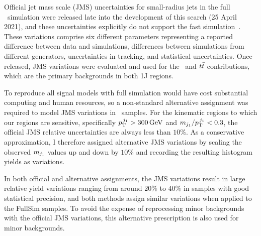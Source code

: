 Official jet mass scale (JMS) uncertainties for small-radius jets in the full
\atlas\ simulation were released late into the development of this search
(25 April 2021), and these uncertainties explicitly do not support the
fast simulation~\cite{atlas_twiki_smallrjms}.
These variations comprise six different parameters representing a reported
difference between data and simulations, differences between simulations from
different generators, uncertainties in tracking, and statistical uncertainties.
Once released, JMS variations were evaluated and used for the \diboson\ and
$\ttbar$ contributions, which are the primary backgrounds in both 1J regions.

To reproduce all signal models with full simulation would have cost substantial
computing and human resources, so a non-standard alternative assignment was
required to model JMS variations in \afii\ samples.
For the kinematic regions to which our regions are sensitive, specifically
$\ptjone > 300\,\eV[G]$ and $\mjetone/\ptjone < 0.3$, the official
JMS relative uncertainties are always less than $10\%$.
As a conservative approximation, I therefore assigned alternative JMS
variations by scaling the observed $\mjetone$ values up and down by $10\%$
and recording the resulting histogram yields as variations.

In both official and alternative assignments, the JMS variations result in
large relative yield variations ranging from around $20\%$ to $40\%$ in samples
with good statistical precision, and both methods assign similar variations
when applied to the FullSim samples.
To avoid the expense of reprocessing minor backgrounds with the official JMS
variations, this alternative prescription is also used for minor backgrounds.

